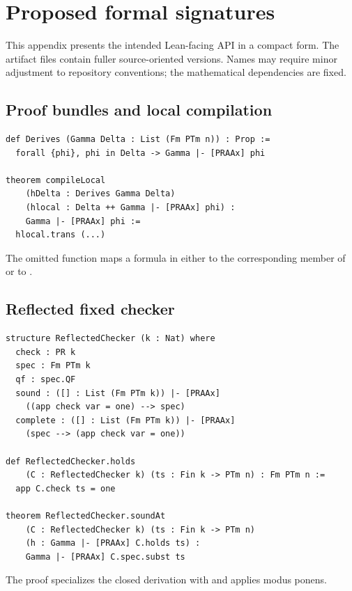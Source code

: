 \section{Proposed formal signatures}

This appendix presents the intended Lean-facing API in a compact form.  The
artifact files contain fuller source-oriented versions.  Names may require
minor adjustment to repository conventions; the mathematical dependencies are
fixed.

\subsection{Proof bundles and local compilation}

\begin{lstlisting}[language=Lean]
def Derives (Gamma Delta : List (Fm PTm n)) : Prop :=
  forall {phi}, phi in Delta -> Gamma |- [PRAAx] phi

theorem compileLocal
    (hDelta : Derives Gamma Delta)
    (hlocal : Delta ++ Gamma |- [PRAAx] phi) :
    Gamma |- [PRAAx] phi :=
  hlocal.trans (...)
\end{lstlisting}

The omitted function maps a formula in  either to the
corresponding member of  or to .

\subsection{Reflected fixed checker}

\begin{lstlisting}[language=Lean]
structure ReflectedChecker (k : Nat) where
  check : PR k
  spec : Fm PTm k
  qf : spec.QF
  sound : ([] : List (Fm PTm k)) |- [PRAAx]
    ((app check var = one) --> spec)
  complete : ([] : List (Fm PTm k)) |- [PRAAx]
    (spec --> (app check var = one))

def ReflectedChecker.holds
    (C : ReflectedChecker k) (ts : Fin k -> PTm n) : Fm PTm n :=
  app C.check ts = one

theorem ReflectedChecker.soundAt
    (C : ReflectedChecker k) (ts : Fin k -> PTm n)
    (h : Gamma |- [PRAAx] C.holds ts) :
    Gamma |- [PRAAx] C.spec.subst ts
\end{lstlisting}

The proof specializes the closed derivation with
 and applies modus ponens.

